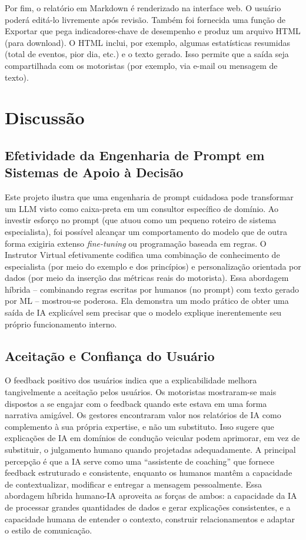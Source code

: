 \documentclass[12pt]{article}
\begin{document}
Por fim, o relatório em Markdown é renderizado na interface web. O usuário poderá editá-lo livremente após revisão. Também foi fornecida uma função de Exportar que pega indicadores-chave de desempenho e produz um arquivo HTML (para download). O HTML inclui, por exemplo, algumas estatísticas resumidas (total de eventos, pior dia, etc.) e o texto gerado. Isso permite que a saída seja compartilhada com os motoristas (por exemplo, via e-mail ou mensagem de texto).

\section{Discussão}

\subsection{Efetividade da Engenharia de Prompt em Sistemas de Apoio à Decisão}

Este projeto ilustra que uma engenharia de prompt cuidadosa pode transformar um LLM visto como caixa-preta em um consultor específico de domínio. Ao investir esforço no prompt (que atuou como um pequeno roteiro de sistema especialista), foi possível alcançar um comportamento do modelo que de outra forma exigiria extenso \textit{fine-tuning} ou programação baseada em regras. O Instrutor Virtual efetivamente codifica uma combinação de conhecimento de especialista (por meio do exemplo e dos princípios) e personalização orientada por dados (por meio da inserção das métricas reais do motorista). Essa abordagem híbrida – combinando regras escritas por humanos (no prompt) com texto gerado por ML – mostrou-se poderosa. Ela demonstra um modo prático de obter uma saída de IA explicável sem precisar que o modelo explique inerentemente seu próprio funcionamento interno.


\subsection{Aceitação e Confiança do Usuário}

O feedback positivo dos usuários indica que a explicabilidade melhora tangivelmente a aceitação pelos usuários. Os motoristas mostraram-se mais dispostos a se engajar com o feedback quando este estava em uma forma narrativa amigável. Os gestores encontraram valor nos relatórios de IA como complemento à sua própria expertise, e não um substituto. Isso sugere que explicações de IA em domínios de condução veicular podem aprimorar, em vez de substituir, o julgamento humano quando projetadas adequadamente. A principal percepção é que a IA serve como uma “assistente de coaching” que fornece feedback estruturado e consistente, enquanto os humanos mantêm a capacidade de contextualizar, modificar e entregar a mensagem pessoalmente. Essa abordagem híbrida humano-IA aproveita as forças de ambos: a capacidade da IA de processar grandes quantidades de dados e gerar explicações consistentes, e a capacidade humana de entender o contexto, construir relacionamentos e adaptar o estilo de comunicação. 
\end{document}
